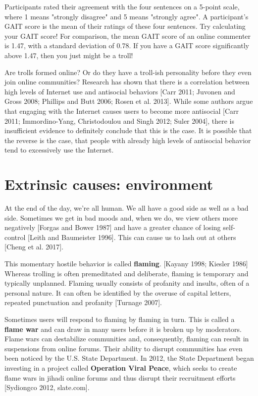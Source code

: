 \documentclass[class=book, crop=false]{standalone}
\providecommand{\keyterm}[1]{\textbf{#1}\marginnote{\scriptsize \textbf{#1}}}
\begin{document}
Participants rated their agreement with the four sentences on a 5-point scale, where 1 means "strongly disagree" and 5 means "strongly agree". A participant's GAIT score is the mean of their ratings of these four sentences. Try calculating your GAIT score! For comparison, the mean GAIT score of an online commenter is 1.47, with a standard deviation of 0.78. If you have a GAIT score significantly above 1.47, then you just might be a troll!

Are trolls formed online? Or do they have a troll-ish personality before they even join online communities? Research has shown that there is a correlation between high levels of Internet use and antisocial behaviors [Carr 2011; Juvonen and Gross 2008; Phillips and Butt 2006; Rosen et al. 2013]. While some authors argue that engaging with the Internet causes users to become more antisocial [Carr 2011; Immordino-Yang, Christodoulou and Singh 2012; Suler 2004], there is insufficient evidence to definitely conclude that this is the case. It is possible that the reverse is the case, that people with already high levels of antisocial behavior tend to excessively use the Internet.

\section{Extrinsic causes: environment}

At the end of the day, we’re all human. We all have a good side as well as a bad side. Sometimes we get in bad moods and, when we do, we view others more negatively [Forgas and Bower 1987] and have a greater chance of losing self-control [Leith and Baumeister 1996]. This can cause us to lash out at others [Cheng et al. 2017].

This momentary hostile behavior is called \keyterm{flaming}. [Kayany 1998; Kiesler 1986] Whereas trolling is often premeditated and deliberate, flaming is temporary and typically unplanned. Flaming usually consists of profanity and insults, often of a personal nature. It can often be identified by the overuse of capital letters, repeated punctuation and profanity [Turnage 2007].

Sometimes users will respond to flaming by flaming in turn. This is called a \keyterm{flame war} and can draw in many users before it is broken up by moderators. Flame wars can destabilize communities and, consequently, flaming can result in suspensions from online forums. Their ability to disrupt communities has even been noticed by the U.S. State Department. In 2012, the State Department began investing in a project called \keyterm{Operation Viral Peace}, which seeks to create flame wars in jihadi online forums and thus disrupt their recruitment efforts [Sydiongco 2012, slate.com].
\end{document}
